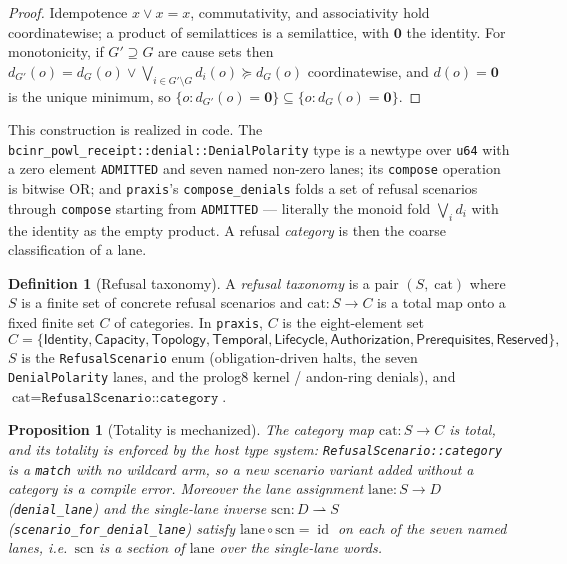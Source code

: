 \documentclass[11pt,oneside]{book}
\theoremstyle{definition}
\newtheorem{definition}{Definition}[chapter]
\theoremstyle{plain}
\newtheorem{proposition}[theorem]{Proposition}
\theoremstyle{remark}
\DeclareMathOperator{\id}{id}
\newcommand{\code}[1]{\texttt{#1}}
\begin{document}
\begin{proof}
Idempotence $x\lor x=x$, commutativity, and associativity hold coordinatewise; a product of
semilattices is a semilattice, with $\bm 0$ the identity. For monotonicity, if
$G'\supseteq G$ are cause sets then $d_{G'}(o)=d_G(o)\lor\bigvee_{i\in G'\setminus G}d_i(o)
\succeq d_G(o)$ coordinatewise, and $d(o)=\bm0$ is the unique minimum, so
$\{o:d_{G'}(o)=\bm0\}\subseteq\{o:d_{G}(o)=\bm0\}$. \end{proof}

This construction is realized in code. The \code{bcinr\_powl\_receipt::denial::DenialPolarity}
type is a newtype over \code{u64} with a zero element \code{ADMITTED} and seven named
non-zero lanes; its \code{compose} operation is bitwise OR; and \code{praxis}'s
\code{compose\_denials} folds a set of refusal scenarios through \code{compose} starting from
\code{ADMITTED} --- literally the monoid fold $\bigvee_i d_i$ with the identity as the empty
product. A refusal \emph{category} is then the coarse classification of a lane.

\begin{definition}[Refusal taxonomy]\label{def:taxonomy}
A \emph{refusal taxonomy} is a pair $(S,\;\text{cat})$ where $S$ is a finite set of concrete
refusal scenarios and $\text{cat}:S\to C$ is a total map onto a fixed finite set $C$ of
categories. In \code{praxis}, $C$ is the eight-element set
\[
C=\{\textsf{Identity},\textsf{Capacity},\textsf{Topology},\textsf{Temporal},
     \textsf{Lifecycle},\textsf{Authorization},\textsf{Prerequisites},\textsf{Reserved}\},
\]
$S$ is the \code{RefusalScenario} enum (obligation-driven halts, the seven
\code{DenialPolarity} lanes, and the prolog8 kernel / andon-ring denials), and
$\text{cat}=\code{RefusalScenario::category}$.
\end{definition}

\begin{proposition}[Totality is mechanized]\label{prop:total}
The category map $\text{cat}:S\to C$ is total, and its totality is enforced by the host type
system: \code{RefusalScenario::category} is a \code{match} with no wildcard arm, so a new
scenario variant added without a category is a compile error. Moreover the lane assignment
$\text{lane}:S\to D$ (\code{denial\_lane}) and the single-lane inverse
$\text{scn}:D\rightharpoonup S$ (\code{scenario\_for\_denial\_lane}) satisfy
$\text{lane}\circ\text{scn}=\id$ on each of the seven named lanes, i.e.\ $\text{scn}$ is a
section of $\text{lane}$ over the single-lane words.
\end{proposition}
\end{document}
